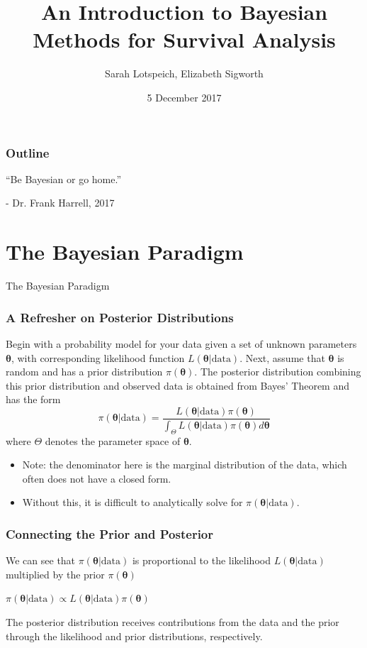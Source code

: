\documentclass{beamer}
\title{An Introduction to Bayesian Methods for Survival Analysis}
\author{Sarah Lotspeich, Elizabeth Sigworth}
\institute{Vanderbilt University}
\date{5 December 2017}
\begin{document}
\begin{frame}
\titlepage
\end{frame}

\begin{frame}
\frametitle{Outline}
\tableofcontents
\end{frame}

\begin{frame}[c]
\begin{center}
\Huge
``Be Bayesian or go home.''  
\huge

- Dr. Frank Harrell, 2017
\end{center}
\end{frame}

\section{The Bayesian Paradigm}
\begin{frame}[c]
\begin{center}
\huge
The Bayesian Paradigm
\end{center}
\end{frame}

\begin{frame}
\frametitle{A Refresher on Posterior Distributions}
Begin with a probability model for your data given a set of unknown parameters $\pmb{\theta}$, with corresponding likelihood function $L(\pmb{\theta}|\text{data})$. Next, assume that $\pmb{\theta}$ is random and has a \color{orange} prior distribution \color{black} $\pi(\pmb{\theta})$. The posterior distribution combining this prior distribution and observed data is obtained from Bayes' Theorem and has the form
$$\pi(\pmb{\theta}|\text{data}) = \frac{L(\pmb{\theta}|\text{data})\pi(\pmb{\theta})}{\int_{\Theta}L(\pmb{\theta}|\text{data})\pi(\pmb{\theta}) d\pmb{\theta}}$$
where $\Theta$ denotes the parameter space of $\pmb{\theta}$. \footnotemark
\begin{itemize}
\item Note: the denominator here is the \color{orange} marginal distribution \color{black} of the data, which often does not have a closed form. 
\item Without this, it is difficult to analytically solve for $\pi(\pmb{\theta}|\text{data})$. 
\end{itemize}
\end{frame}

\begin{frame}
\frametitle{Connecting the Prior and Posterior}
We can see that $\pi(\pmb{\theta}|\text{data})$ is proportional to the likelihood $L(\pmb{\theta}|\text{data})$ multiplied by the prior $\pi(\pmb{\theta})$

\begin{center}
$\pi(\pmb{\theta}|\text{data}) \propto L(\pmb{\theta}|\text{data})\pi(\pmb{\theta})$
\end{center}

The posterior distribution receives contributions from the data and the prior through the likelihood and prior distributions, respectively. 
\end{frame}
\end{document}

